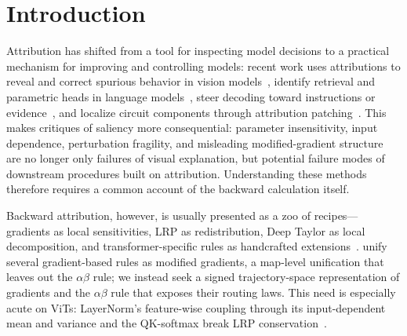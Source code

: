\documentclass[twoside]{article}
\newif\ifch \chfalse
\newcommand{\ch}[1]{\ifch\textcolor{magenta}{#1}\else#1\fi}
\newcommand{\1}{\mathbf{1}}
\begin{document}
\section{Introduction}\label{sec:intro}

Attribution has shifted from a tool for inspecting model decisions to a practical mechanism for
improving and controlling models: recent work uses attributions to reveal and correct spurious
behavior in vision models~\citep{Pahde2023R2R}, identify retrieval and parametric heads in language
models~\citep{Kahardipraja2025Atlas}, steer decoding toward instructions or
evidence~\citep{Komorowski2026AGD}, and localize circuit components through attribution
patching~\citep{Syed2024AttributionPatching,Kramar2024AtPStar,Hanna2024Faithfulness}. This makes
critiques of saliency more consequential: parameter insensitivity, input dependence, perturbation
fragility, and misleading modified-gradient structure~\citep{Adebayo2018sanity, Kindermans2018,
Ghorbani2019fragile, Nie2018guided} are no longer only failures of visual explanation, but
potential failure modes of downstream procedures built on attribution. Understanding these methods
therefore requires a common account of the backward calculation itself.

Backward attribution, however, is usually presented as a zoo of recipes---gradients as local
sensitivities, \ac{LRP} as redistribution, Deep Taylor as local decomposition, and
transformer-specific rules as handcrafted extensions~\citep{Bach2015, Montavon2017, Binder2016,
Kohlbrenner2020, Chefer2021transformer, Ali2022, achtibat2024attnlrp, Wrobel2024}. \ch{\citet{Ancona2018}
unify several gradient-based rules as modified gradients, a map-level unification that leaves out
the $\alpha\beta$ rule; we instead seek a signed trajectory-space representation of gradients and
the $\alpha\beta$ rule that exposes their routing laws. This need} is especially acute on \acp{ViT}: \ch{LayerNorm's feature-wise coupling through its
input-dependent mean and variance} and the QK-softmax break \ac{LRP} conservation~\citep{Ali2022}.
\end{document}
